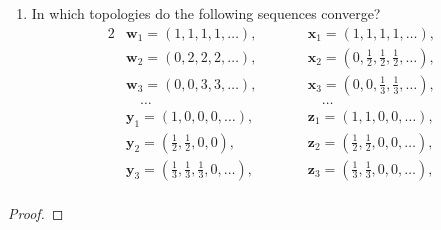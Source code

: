 \documentclass[a4paper,10pt]{article}
\newcommand{\bx}{\mathbf{x}}
\newcommand{\by}{\mathbf{y}}
\newcommand{\bz}{\mathbf{z}}
\newcommand{\bw}{\mathbf{w}}
\begin{document}
\begin{solution}
    \begin{enumerate}[label={(\alph*)}, align=left, leftmargin=\parindent, listparindent=\parindent, labelwidth=0pt, itemindent=!]
        \addtocounter{enumi}{1} 
        \item In which topologies do the following sequences converge?
        \begin{alignat*}{2}
            & \bw_1 = (1, 1, 1, 1, \ldots),\qquad   & & \bx_1 = (1, 1, 1, 1, \ldots), \\
            & \bw_2 = (0, 2, 2, 2, \ldots),\qquad   & & \bx_2 = (0, \tfrac{1}{2}, \tfrac{1}{2}, \tfrac{1}{2}, \ldots), \\
            & \bw_3 = (0, 0, 3, 3, \ldots),\qquad   & & \bx_3 = (0, 0, \tfrac{1}{3}, \tfrac{1}{3}, \ldots), \\
            & \quad\ldots                           & & \quad\ldots \\
            & \by_1 = (1, 0, 0, 0, \ldots),\qquad   & & \bz_1 = (1, 1, 0, 0, \ldots), \\
            & \by_2 = (\tfrac{1}{2}, \tfrac{1}{2}, 0, 0),                       & & \bz_2 = (\tfrac{1}{2}, \tfrac{1}{2}, 0, 0, \ldots), \\
            & \by_3 = (\tfrac{1}{3}, \tfrac{1}{3}, \tfrac{1}{3}, 0, \ldots),    & & \bz_3 = (\tfrac{1}{3}, \tfrac{1}{3}, 0, 0, \ldots), \\
        \end{alignat*}
    \end{enumerate}
    \begin{proof}
    \end{proof}
\end{solution}
\end{document}
